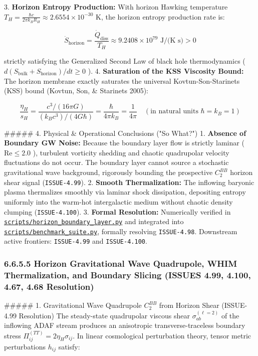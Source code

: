 \documentclass[11pt,a4paper]{article}
\theoremstyle{definition}
\theoremstyle{remark}
\begin{document}
3. \textbf{Horizon Entropy Production:} With horizon Hawking temperature $T_H = \frac{\hbar c}{2\pi k_B R_H} \approx 2.6554 \times 10^{-30}\text{ K}$, the horizon entropy production rate is:


\begin{equation}
\dot{S}_{\text{horizon}} = \frac{\dot{Q}_{\text{diss}}}{T_H} \approx 9.2408 \times 10^{79}\text{ J/(K s)} > 0
\end{equation}


strictly satisfying the Generalized Second Law of black hole thermodynamics ( $d(S_{\text{bulk}} + S_{\text{horizon}})/dt \ge 0$ ).
4. \textbf{Saturation of the KSS Viscosity Bound:} The horizon membrane exactly saturates the universal Kovtun-Son-Starinets (KSS) bound (Kovtun, Son, \& Starinets 2005):


\begin{equation}
\frac{\eta_H}{s_H} = \frac{c^3 / (16\pi G)}{(k_B c^3) / (4 G \hbar)} = \frac{\hbar}{4\pi k_B} = \frac{1}{4\pi} \quad (\text{in natural units } \hbar = k_B = 1)
\end{equation}


\#\#\#\#\# 4. Physical \& Operational Conclusions ("So What?")
1. \textbf{Absence of Boundary GW Noise:} Because the boundary layer flow is strictly laminar ( $\mathrm{Re} \le 2.0$ ), turbulent vorticity shedding and chaotic quadrupolar velocity fluctuations do not occur. The boundary layer cannot source a stochastic gravitational wave background, rigorously bounding the prospective $C_2^{BB}$ horizon shear signal (\texttt{ISSUE-4.99}).
2. \textbf{Smooth Thermalization:} The inflowing baryonic plasma thermalizes smoothly via laminar shock dissipation, depositing entropy uniformly into the warm-hot intergalactic medium without chaotic density clumping (\texttt{ISSUE-4.100}).
3. \textbf{Formal Resolution:} Numerically verified in \href{../../scripts/horizon_boundary_layer.py}{\texttt{scripts/horizon_boundary_layer.py}} and integrated into \href{../../scripts/benchmark_suite.py}{\texttt{scripts/benchmark_suite.py}}, formally resolving \texttt{ISSUE-4.98}. Downstream active frontiers: \texttt{ISSUE-4.99} and \texttt{ISSUE-4.100}.

\subsubsection{6.6.5.5 Horizon Gravitational Wave Quadrupole, WHIM Thermalization, and Boundary Slicing (ISSUES 4.99, 4.100, 4.67, 4.68 Resolution)}

\#\#\#\#\# 1. Gravitational Wave Quadrupole $C_2^{BB}$ from Horizon Shear (ISSUE-4.99 Resolution)
The steady-state quadrupolar viscous shear $\sigma_{ab}^{(\ell=2)}$ of the inflowing ADAF stream produces an anisotropic transverse-traceless boundary stress $\Pi_{ij}^{(TT)} = 2\eta_H \sigma_{ij}$. In linear cosmological perturbation theory, tensor metric perturbations $h_{ij}$ satisfy:
\end{document}
